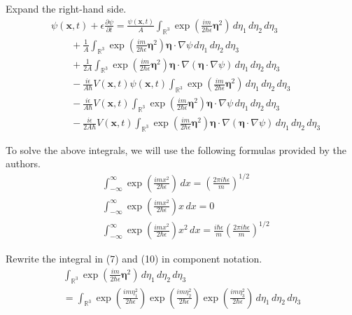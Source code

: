 \documentclass[12pt]{article}
\begin{document}
Expand the right-hand side.
\begin{align*}
&\psi(\mathbf{x},t)+\epsilon\frac{\partial\psi}{\partial t}
=\frac{\psi(\mathbf x,t)}{A}\int_{\mathbb R^3}
\exp\left(\frac{im}{2\hbar\epsilon}\boldsymbol\eta^2\right)
\,d\eta_1\,d\eta_2\,d\eta_3
\tag{7}
\\
&\qquad{}+\frac{1}{A}\int_{\mathbb R^3}
\exp\left(\frac{im}{2\hbar\epsilon}\boldsymbol\eta^2\right)
\boldsymbol\eta\cdot\nabla\psi
\,d\eta_1\,d\eta_2\,d\eta_3
\tag{8}
\\
&\qquad{}+\frac{1}{2A}\int_{\mathbb R^3}
\exp\left(\frac{im}{2\hbar\epsilon}\boldsymbol\eta^2\right)
\boldsymbol\eta\cdot\nabla(\boldsymbol\eta\cdot\nabla\psi)
\,d\eta_1\,d\eta_2\,d\eta_3
\tag{9}
\\
&\qquad{}-\frac{i\epsilon}{A\hbar}V\left(\mathbf x,t\right)\psi(\mathbf x,t)\int_{\mathbb R^3}
\exp\left(\frac{im}{2\hbar\epsilon}\boldsymbol\eta^2\right)
\,d\eta_1\,d\eta_2\,d\eta_3
\tag{10}
\\
&\qquad{}-\frac{i\epsilon}{A\hbar}V\left(\mathbf x,t\right)\int_{\mathbb R^3}
\exp\left(\frac{im}{2\hbar\epsilon}\boldsymbol\eta^2\right)
\boldsymbol\eta\cdot\nabla\psi
\,d\eta_1\,d\eta_2\,d\eta_3
\tag{11}
\\
&\qquad{}-\frac{i\epsilon}{2A\hbar}V\left(\mathbf x,t\right)\int_{\mathbb R^3}
\exp\left(\frac{im}{2\hbar\epsilon}\boldsymbol\eta^2\right)
\boldsymbol\eta\cdot\nabla(\boldsymbol\eta\cdot\nabla\psi)
\,d\eta_1\,d\eta_2\,d\eta_3
\tag{12}
\end{align*}

To solve the above integrals, we will use the following formulas provided by the authors.
\begin{align*}
&\int_{-\infty}^\infty\exp\left(\frac{imx^2}{2\hbar\epsilon}\right)\,dx
=\left(\frac{2\pi i\hbar\epsilon}{m}\right)^{1/2}
\tag{13}
\\
&\int_{-\infty}^\infty\exp\left(\frac{imx^2}{2\hbar\epsilon}\right)x\,dx
=0
\tag{14}
\\
&\int_{-\infty}^\infty\exp\left(\frac{imx^2}{2\hbar\epsilon}\right)x^2\,dx
=\frac{i\hbar\epsilon}{m}\left(\frac{2\pi i\hbar\epsilon}{m}\right)^{1/2}
\tag{15}
\end{align*}

Rewrite the integral in (7) and (10) in component notation.
\begin{multline*}
\int_{\mathbb R^3}
\exp\left(\frac{im}{2\hbar\epsilon}\boldsymbol\eta^2\right)
\,d\eta_1\,d\eta_2\,d\eta_3
\\
{}=\int_{\mathbb R^3}
\exp\left(\frac{im\eta_1^2}{2\hbar\epsilon}\right)
\exp\left(\frac{im\eta_2^2}{2\hbar\epsilon}\right)
\exp\left(\frac{im\eta_3^2}{2\hbar\epsilon}\right)
\,d\eta_1\,d\eta_2\,d\eta_3
\end{multline*}
\end{document}
